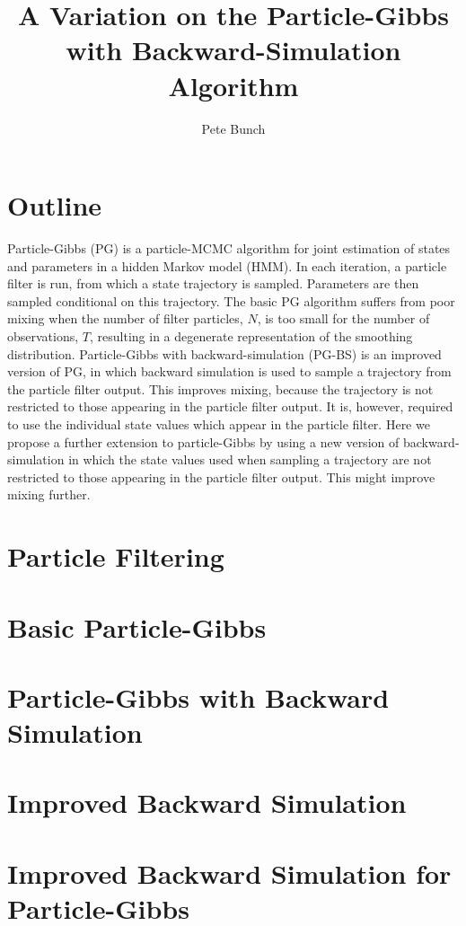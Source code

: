 \documentclass{article}
\title{A Variation on the Particle-Gibbs with Backward-Simulation Algorithm}
\author{Pete Bunch}
\begin{document}
\maketitle

\section{Outline}

Particle-Gibbs (PG) is a particle-MCMC algorithm for joint estimation of states and parameters in a hidden Markov model (HMM). In each iteration, a particle filter is run, from which a state trajectory is sampled. Parameters are then sampled conditional on this trajectory. The basic PG algorithm suffers from poor mixing when the number of filter particles, $N$, is too small for the number of observations, $T$, resulting in a degenerate representation of the smoothing distribution. Particle-Gibbs with backward-simulation (PG-BS) is an improved version of PG, in which backward simulation is used to sample a trajectory from the particle filter output. This improves mixing, because the trajectory is not restricted to those appearing in the particle filter output. It is, however, required to use the individual state values which appear in the particle filter. Here we propose a further extension to particle-Gibbs by using a new version of backward-simulation in which the state values used when sampling a trajectory are not restricted to those appearing in the particle filter output. This might improve mixing further.

\section{Particle Filtering}

\section{Basic Particle-Gibbs}

\section{Particle-Gibbs with Backward Simulation}

\section{Improved Backward Simulation}

\section{Improved Backward Simulation for Particle-Gibbs}
\end{document}
